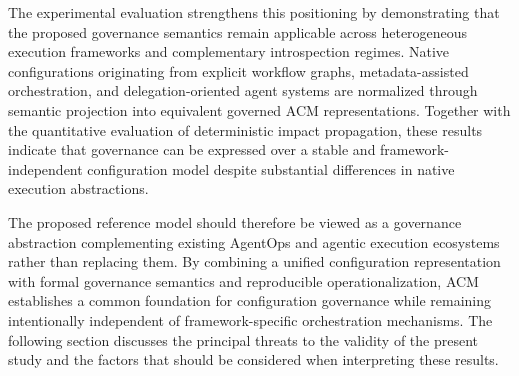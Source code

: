 \documentclass[10pt]{article}
\begin{document}
The experimental evaluation strengthens this positioning by demonstrating that the proposed governance semantics remain applicable across heterogeneous execution frameworks and complementary introspection regimes. Native configurations originating from explicit workflow graphs, metadata-assisted orchestration, and delegation-oriented agent systems are normalized through semantic projection into equivalent governed ACM representations. Together with the quantitative evaluation of deterministic impact propagation, these results indicate that governance can be expressed over a stable and framework-independent configuration model despite substantial differences in native execution abstractions.

The proposed reference model should therefore be viewed as a governance abstraction complementing existing AgentOps and agentic execution ecosystems rather than replacing them. By combining a unified configuration representation with formal governance semantics and reproducible operationalization, ACM establishes a common foundation for configuration governance while remaining intentionally independent of framework-specific orchestration mechanisms. The following section discusses the principal threats to the validity of the present study and the factors that should be considered when interpreting these results.



\end{document}
